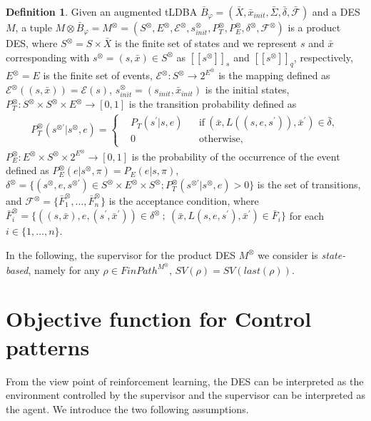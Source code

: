 \documentclass[10 pt, dvipdfmx]{article}
\theoremstyle{definition}
\newtheorem{definition}{Definition}[section]
\newcommand{\mysps}{\ensuremath{[\![s^{\otimes}]\!]}_s}
\newcommand{\myspq}{\ensuremath{[\![s^{\otimes}]\!]}_q}
\begin{document}
\begin{definition}
  Given an augmented tLDBA $\bar{B}_{\varphi} = (\bar{X}, \bar{x}_{init},\bar{\Sigma},\bar{\delta},\bar{\mathcal{F}})$ and a DES $M$, a tuple $M \otimes \bar{B}_{\varphi} = M^{\otimes} = (S^{\otimes}, E^{\otimes}, {\mathcal E}^{\otimes}, s_{init}^{\otimes}, P^{\otimes}_T, P^{\otimes}_E, \delta^{\otimes}, {\mathcal F}^{\otimes})$ is a product DES, where
  $S^{\otimes} = S \times \bar{X}$ is the finite set of states and we represent $s$ and $\bar{x}$ corresponding with $s^{\otimes} = (s,\bar{x}) \in S^{\otimes}$ as $\mysps$ and $\myspq$, respectively, $E^{\otimes}=E$ is the finite set of events, ${\mathcal E}^{\otimes} : S^{\otimes} \rightarrow 2^{E^{\otimes}}$ is the mapping defined as ${\mathcal E}^{\otimes}((s,\bar{x})) = {\mathcal E}(s)$, $s_{init}^{\otimes} = (s_{init},\bar{x}_{init})$ is the initial states, $P^{\otimes}_T : S^{\otimes} \times S^{\otimes} \times E^{\otimes} \rightarrow [0,1]$ is the transition probability defined as
  \begin{align}
    P^{\otimes}_T(s^{\otimes \prime} | s^{\otimes}, e) =
    \left\{
    \begin{aligned}
      &P_T(s^{\prime} | s, e) &   &\text{if}\  (\bar{x}, L((s,e,s^{\prime})), \bar{x}^{\prime}) \in \bar{\delta},\\
      &0 &   &\text{otherwise} ,
    \end{aligned}
    \right. \nonumber
  \end{align}
  $P^{\otimes}_E : E^{\otimes} \times S^{\otimes} \times 2^{E^{\otimes}} \rightarrow [0,1]$ is the probability of the occurrence of the event defined as $P^{\otimes}_E(e | s^{\otimes}, \pi) = P_E(e | s, \pi)$, $\delta^{\otimes} = \{ (s^{\otimes}, e, s^{\otimes \prime}) \in S^{\otimes} \times E^{\otimes} \times S^{\otimes} ; P^{\otimes}_T(s^{\otimes \prime} | s^{\otimes}, e) > 0 \}$ is the set of transitions, and ${\mathcal F}^{\otimes} = \{ \bar{F}^{\otimes}_1, \ldots ,\bar{F}^{\otimes}_n \}$ is the acceptance condition, where $\bar{F}^{\otimes}_i = \{ ((s,\bar{x}), e, (s^{\prime}, \bar{x}^{\prime})) \in \delta^{\otimes}\ ;\ (\bar{x}, L(s,e,s^{\prime}), \bar{x}^{\prime}) \in \bar{F}_i \}$ for each $ i \in \{ 1, \ldots ,n \}$.
\end{definition}

In the following, the supervisor for the product DES $M^{\otimes}$ we consider is {\it state-based}, namely for any $\rho \in FinPath^{M^{\otimes}}$, $SV(\rho) = SV(last(\rho))$.

\section{Objective function for Control patterns}
From the view point of reinforcement learning, the DES can be interpreted as the environment controlled by the supervisor and the supervisor can be interpreted as the agent. We introduce the two following assumptions.
\end{document}
